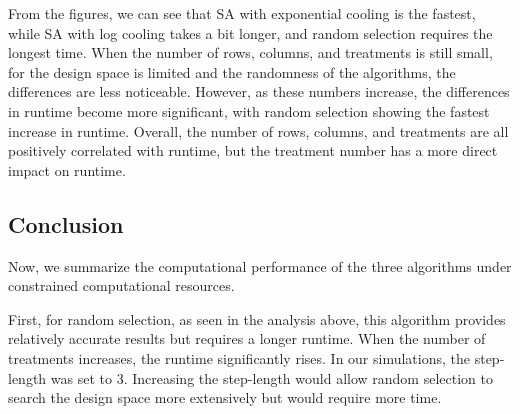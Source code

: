 \documentclass[
  a4paper,
  oneside,
  openany,
  12pt,
  onecolumn]{book}
\theoremstyle{plain}
\theoremstyle{definition}
\theoremstyle{remark}
\begin{document}
\begin{figure}


\caption{\label{fig-align}}

\end{figure}%

From the figures, we can see that SA with exponential cooling is the
fastest, while SA with log cooling takes a bit longer, and random
selection requires the longest time. When the number of rows, columns,
and treatments is still small, for the design space is limited and the
randomness of the algorithms, the differences are less noticeable.
However, as these numbers increase, the differences in runtime become
more significant, with random selection showing the fastest increase in
runtime. Overall, the number of rows, columns, and treatments are all
positively correlated with runtime, but the treatment number has a more
direct impact on runtime.

\subsection{Conclusion}\label{conclusion}

Now, we summarize the computational performance of the three algorithms
under constrained computational resources.

First, for random selection, as seen in the analysis above, this
algorithm provides relatively accurate results but requires a longer
runtime. When the number of treatments increases, the runtime
significantly rises. In our simulations, the step-length was set to 3.
Increasing the step-length would allow random selection to search the
design space more extensively but would require more time.
\end{document}
